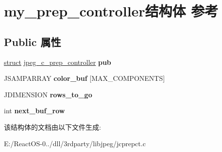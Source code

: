 \hypertarget{structmy__prep__controller}{}\section{my\+\_\+prep\+\_\+controller结构体 参考}
\label{structmy__prep__controller}
\subsection*{Public 属性}
\begin{DoxyCompactItemize}
\item 
\mbox{\label{structmy__prep__controller_a3fb45ffb334d46e9786e32eefded333a}} 
\hyperlink{interfacestruct}{struct} \hyperlink{structjpeg__c__prep__controller}{jpeg\+\_\+c\+\_\+prep\+\_\+controller} {\bfseries pub}
\item 
\mbox{\label{structmy__prep__controller_ac1479671472328faf5d381a202658783}} 
J\+S\+A\+M\+P\+A\+R\+R\+AY {\bfseries color\+\_\+buf} \mbox{[}M\+A\+X\+\_\+\+C\+O\+M\+P\+O\+N\+E\+N\+TS\mbox{]}
\item 
\mbox{\label{structmy__prep__controller_a824b65d503dae6698d6a482d49a8043c}} 
J\+D\+I\+M\+E\+N\+S\+I\+ON {\bfseries rows\+\_\+to\+\_\+go}
\item 
\mbox{\label{structmy__prep__controller_af93cf69d2ea14660586c93a1b08774a2}} 
int {\bfseries next\+\_\+buf\+\_\+row}
\end{DoxyCompactItemize}


该结构体的文档由以下文件生成\+:\begin{DoxyCompactItemize}
\item 
E\+:/\+React\+O\+S-\/0../dll/3rdparty/libjpeg/jcprepct.\+c\end{DoxyCompactItemize}
